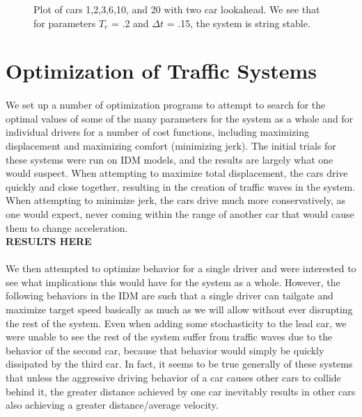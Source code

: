 \documentclass[12pt]{article}
\begin{document}
\begin{figure}[H]
  \centering
  \caption{Plot of cars 1,2,3,6,10, and 20 with two car lookahead. We see that for parameters $T_r$ = .2 and $\Delta t$ = .15, the system is string stable.}
\end{figure}

\section{Optimization of Traffic Systems}
\paragraph{}We set up a number of optimization programs to attempt to search for the optimal values of some of the many parameters for the system as a whole and for individual drivers for a number of cost functions, including maximizing displacement and maximizing comfort (minimizing jerk). The initial trials for these systems were run on IDM models, and the results are largely what one would suspect. When attempting to maximize total displacement, the cars drive quickly and close together, resulting in the creation of traffic waves in the system. When attempting to minimize jerk, the cars drive much more conservatively, as one would expect, never coming within the range of another car that would cause them to change acceleration. \\
\textbf{RESULTS HERE}
\paragraph{}We then attempted to optimize behavior for a single driver and were interested to see what implications this would have for the system as a whole. However, the following behaviors in the IDM are such that a single driver can tailgate and maximize target speed basically as much as we will allow without ever disrupting the rest of the system. Even when adding some stochasticity to the lead car, we were unable to see the rest of the system suffer from traffic waves due to the behavior of the second car, because that behavior would simply be quickly dissipated by the third car. In fact, it seems to be true generally of these systems that unless the aggressive driving behavior of a car causes other cars to collide behind it, the greater distance achieved by one car inevitably results in other cars also achieving a greater distance/average velocity. \\
\end{document}
